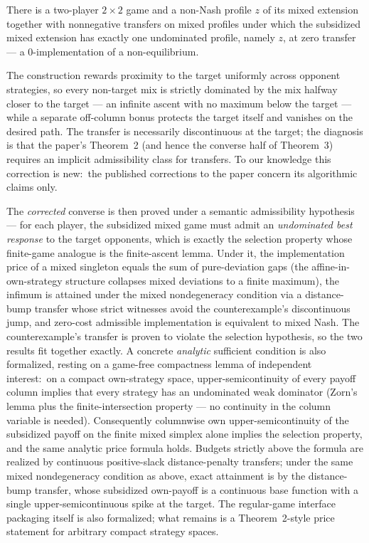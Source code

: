 \begin{theorem}
\label{thm:kimpl-mixed-converse}
There is a two-player $2\times2$ game and a non-Nash profile $z$ of
its mixed extension together with nonnegative transfers on mixed
profiles under which the subsidized mixed extension has exactly one
undominated profile, namely $z$, at zero transfer — a
0-implementation of a non-equilibrium.
\end{theorem}

\noindent The construction rewards proximity to the target uniformly
across opponent strategies, so every non-target mix is strictly
dominated by the mix halfway closer to the target — an infinite
ascent with no maximum below the target — while a separate
off-column bonus protects the target itself and vanishes on the
desired path.  The transfer is necessarily discontinuous at the
target; the diagnosis is that the paper's Theorem~2 (and hence the
converse half of Theorem~3) requires an implicit admissibility class
for transfers.  To our knowledge this correction is new:\ the
published corrections to the paper
\citep{Eidenbenz2007, Eidenbenz2011, DengTangZheng2016} concern its
algorithmic claims only.

The \emph{corrected} converse is then proved under a semantic
admissibility hypothesis — for each player, the subsidized mixed game
must admit an \emph{undominated best response} to the target
opponents, which is exactly the selection property whose finite-game
analogue is the finite-ascent lemma.  Under it, the implementation
price of a mixed singleton equals the sum of pure-deviation gaps (the
affine-in-own-strategy structure collapses mixed deviations to a
finite maximum), the infimum is attained under the mixed
nondegeneracy condition via a distance-bump transfer whose strict
witnesses avoid the counterexample's discontinuous jump, and
zero-cost admissible implementation is equivalent to mixed Nash.  The
counterexample's transfer is proven to violate the selection
hypothesis, so the two results fit together exactly.  A concrete
\emph{analytic} sufficient condition is also formalized, resting on a
game-free compactness lemma of independent interest:\ on a compact
own-strategy space, upper-semicontinuity of every payoff column
implies that every strategy has an undominated weak dominator (Zorn's
lemma plus the finite-intersection property — no continuity in the
column variable is needed).  Consequently columnwise own
upper-semicontinuity of the subsidized payoff on the finite mixed
simplex alone implies the selection property, and the same analytic
price formula holds.  Budgets strictly above the formula are realized
by continuous positive-slack distance-penalty transfers; under the
same mixed nondegeneracy condition as above, exact attainment is by
the distance-bump transfer, whose subsidized own-payoff is a
continuous base function with a single upper-semicontinuous spike at
the target.  The regular-game interface packaging itself is also
formalized; what remains is a Theorem~2-style price statement for
arbitrary compact strategy spaces.


